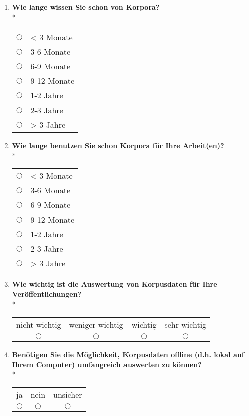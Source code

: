 \begin{enumerate}
	\item{
		\textbf{Wie lange wissen Sie schon von Korpora?}\\*
		
			\begin{tabular}{c l}
				$\bigcirc$ & < 3 Monate \\
				$\bigcirc$ & 3-6 Monate \\
				$\bigcirc$ & 6-9 Monate \\
				$\bigcirc$ & 9-12 Monate \\
				$\bigcirc$ & 1-2 Jahre \\
				$\bigcirc$ & 2-3 Jahre \\
				$\bigcirc$ & > 3 Jahre
			\end{tabular}
	}
	
	\item{
		\textbf{Wie lange benutzen Sie schon Korpora für Ihre Arbeit(en)?}\\*

			\begin{tabular}{c l}
				$\bigcirc$ & < 3 Monate \\
				$\bigcirc$ & 3-6 Monate \\
				$\bigcirc$ & 6-9 Monate \\
				$\bigcirc$ & 9-12 Monate \\
				$\bigcirc$ & 1-2 Jahre \\
				$\bigcirc$ & 2-3 Jahre \\ 
				$\bigcirc$ & > 3 Jahre
			\end{tabular}
	}
	
	\item{
		\textbf{Wie wichtig ist die Auswertung von Korpusdaten für Ihre Veröffentlichungen?}\\*
		\begin{center}
			\begin{tabular}{c | c | c | c}
				nicht wichtig & weniger wichtig & wichtig & sehr wichtig \\
				$\bigcirc$ & $\bigcirc$ & $\bigcirc$ & $\bigcirc$
			\end{tabular}
		\end{center}
	}
	
	\item{
		\textbf{Benötigen Sie die Möglichkeit, Korpusdaten offline (d.h. lokal auf Ihrem Computer) umfangreich auswerten zu können?}\\*
		\begin{center}
			\begin{tabular}{c | c | c}
					ja & nein & unsicher \\
					$\bigcirc$ & $\bigcirc$ & $\bigcirc$
			\end{tabular}
		\end{center}
	}
	

\end{enumerate}
